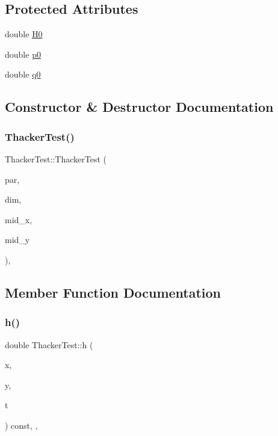 \subsection*{Protected Attributes}
\begin{DoxyCompactItemize}
\item 
double \hyperlink{classThackerTest_a7a951789e0eee6467ef9bd5f371ba7bf}{H0}
\item 
double \hyperlink{classThackerTest_a05f901f7541aab19669ed7f50edd8e22}{p0}
\item 
double \hyperlink{classThackerTest_a770dc7e3393c068de49067a85eab799d}{q0}
\end{DoxyCompactItemize}


\subsection{Constructor \& Destructor Documentation}
\mbox{\label{classThackerTest_a50e9631451a42143fe78def6ed4d1018}} 
\subsubsection{\texorpdfstring{Thacker\+Test()}{ThackerTest()}}
{\footnotesize\ttfamily Thacker\+Test\+::\+Thacker\+Test (\begin{DoxyParamCaption}\item[{const \hyperlink{structParser}{Parser} \&}]{par,  }\item[{const \hyperlink{structDimensionManager}{Dimension\+Manager} \&}]{dim,  }\item[{double}]{mid\+\_\+x,  }\item[{double}]{mid\+\_\+y }\end{DoxyParamCaption})\hspace{0.3cm}{\ttfamily [inline]}, {\ttfamily [protected]}}



\subsection{Member Function Documentation}
\mbox{\label{classThackerTest_a55163711b089d6577452f24add0bb291}} 
\subsubsection{\texorpdfstring{h()}{h()}}
{\footnotesize\ttfamily double Thacker\+Test\+::h (\begin{DoxyParamCaption}\item[{double}]{x,  }\item[{double}]{y,  }\item[{double}]{t }\end{DoxyParamCaption}) const\hspace{0.3cm}{\ttfamily [inline]}, {\ttfamily [override]}, {\ttfamily [virtual]}}



